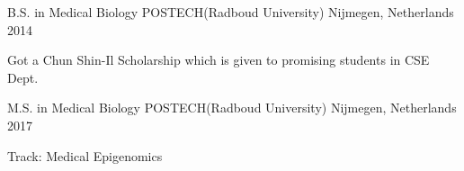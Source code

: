 

\begin{cventries}

  \cventry
    {B.S. in Medical Biology} %
    {POSTECH(Radboud University)} %
    {Nijmegen, Netherlands} %
    {2014} %
    {
      \begin{cvitems} %
        \item {Got a Chun Shin-Il Scholarship which is given to promising students in CSE Dept.}
      \end{cvitems}
    }
  \cventry
    {M.S. in Medical Biology}
    {POSTECH(Radboud University)} %
    {Nijmegen, Netherlands} %
    {2017} %
    {
      \begin{cvitems} %
        \item {Track: Medical Epigenomics}
      \end{cvitems}
    }


\end{cventries}
